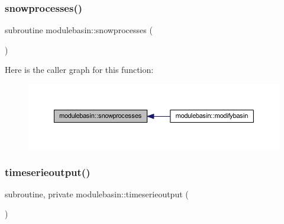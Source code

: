 \subsubsection{\texorpdfstring{snowprocesses()}{snowprocesses()}}
{\footnotesize\ttfamily subroutine modulebasin\+::snowprocesses (\begin{DoxyParamCaption}{ }\end{DoxyParamCaption})\hspace{0.3cm}{\ttfamily [private]}}

Here is the caller graph for this function\+:\nopagebreak
\begin{figure}[H]
\begin{center}
\leavevmode
\includegraphics[width=350pt]{namespacemodulebasin_a19824f46960f411ab472a65b6e3a9d2e_icgraph}
\end{center}
\end{figure}
\mbox{\label{namespacemodulebasin_a5d090cabe217c5ee21e1b627217a129f}} 
\subsubsection{\texorpdfstring{timeserieoutput()}{timeserieoutput()}}
{\footnotesize\ttfamily subroutine, private modulebasin\+::timeserieoutput (\begin{DoxyParamCaption}{ }\end{DoxyParamCaption})\hspace{0.3cm}{\ttfamily [private]}}

